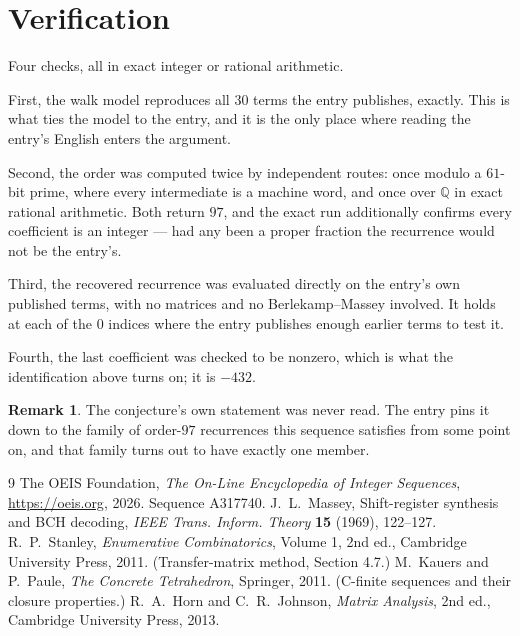 \documentclass[11pt,a4paper]{article}
\theoremstyle{plain}
\theoremstyle{definition}
\newtheorem{remark}[theorem]{Remark}
\begin{document}
\section{Verification}

Four checks, all in exact integer or rational arithmetic.

First, the walk model reproduces all $30$ terms the entry publishes, exactly. This is
what ties the model to the entry, and it is the only place where reading the entry's English
enters the argument.

Second, the order was computed twice by independent routes: once modulo a $61$-bit prime, where
every intermediate is a machine word, and once over $\mathbb{Q}$ in exact rational arithmetic.
Both return $97$, and the exact run additionally confirms every coefficient is an integer
--- had any been a proper fraction the recurrence would not be the entry's.

Third, the recovered recurrence was evaluated directly on the entry's own published terms, with
no matrices and no Berlekamp--Massey involved. It holds at each of the $0$ indices where
the entry publishes enough earlier terms to test it.

Fourth, the last coefficient was checked to be nonzero, which is what the identification above
turns on; it is $-432$.

\begin{remark}
The conjecture's own statement was never read. The entry pins it down to the family of
order-$97$ recurrences this sequence satisfies from some point on, and that family turns
out to have exactly one member.
\end{remark}

\begin{thebibliography}{9}
 The OEIS Foundation, \emph{The On-Line Encyclopedia of Integer
Sequences}, \url{https://oeis.org}, 2026. Sequence A317740.
 J.~L.~Massey, Shift-register synthesis and BCH decoding, \emph{IEEE
Trans. Inform. Theory} \textbf{15} (1969), 122--127.
 R.~P.~Stanley, \emph{Enumerative Combinatorics}, Volume 1, 2nd ed.,
Cambridge University Press, 2011. (Transfer-matrix method, Section 4.7.)
 M.~Kauers and P.~Paule, \emph{The Concrete Tetrahedron}, Springer, 2011.
(C-finite sequences and their closure properties.)
 R.~A.~Horn and C.~R.~Johnson, \emph{Matrix Analysis}, 2nd ed., Cambridge
University Press, 2013.
\end{thebibliography}
\end{document}
